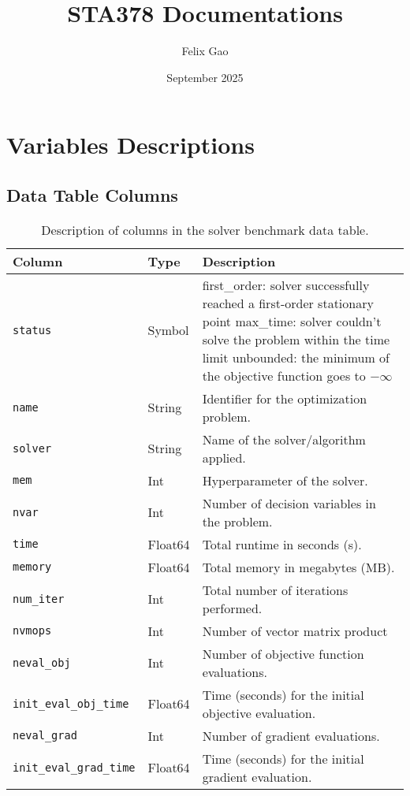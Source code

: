\documentclass{article}
\title{STA378 Documentations}
\author{Felix Gao}
\date{September 2025}
\begin{document}
\maketitle

\section{Variables Descriptions}
\subsection*{Data Table Columns}

\begin{table}[h!]
\centering
\begin{tabular}{|l|l|p{10.5cm}|}
\hline
\textbf{Column} & \textbf{Type} & \textbf{Description} \\
\hline
\texttt{status} & Symbol   & \makecell[l]{first\_order: solver successfully reached a first-order stationary point\\ max\_time: solver couldn't solve the problem within the time limit\\ unbounded: the minimum of the objective function goes to $-\infty$} \\
\hline
\texttt{name} & String   & Identifier for the optimization problem. \\
\hline
\texttt{solver} & String   & Name of the solver/algorithm applied. \\
\hline
\texttt{mem} & Int   & Hyperparameter of the solver. \\
\hline
\texttt{nvar} & Int   & Number of decision variables in the problem. \\
\hline
\texttt{time} & Float64   & Total runtime in seconds (s). \\
\hline
\texttt{memory} & Float64   & Total memory in megabytes (MB). \\
\hline
\texttt{num\_iter} & Int   & Total number of iterations performed. \\
\hline
\texttt{nvmops} & Int   & Number of vector matrix product \\
\hline
\texttt{neval\_obj} & Int   & Number of objective function evaluations. \\
\hline
\texttt{init\_eval\_obj\_time} & Float64   & Time (seconds) for the initial objective evaluation. \\
\hline
\texttt{neval\_grad} & Int   & Number of gradient evaluations. \\
\hline
\texttt{init\_eval\_grad\_time} & Float64   & Time (seconds) for the initial gradient evaluation. \\
\hline
\end{tabular}
\caption{Description of columns in the solver benchmark data table.}
\end{table}
\end{document}
